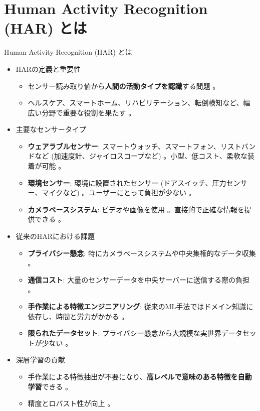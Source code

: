 \documentclass[unicode,12pt,aspectratio=169,dvipdfmx]{beamer}
\begin{document}
\section{Human Activity Recognition (HAR) とは}
\begin{frame}{Human Activity Recognition (HAR) とは}
    \begin{itemize}
        \item HARの定義と重要性
        \begin{itemize}
            \item センサー読み取り値から\textbf{人間の活動タイプを認識}する問題 \cite{Source222}。
            \item ヘルスケア、スマートホーム、リハビリテーション、転倒検知など、幅広い分野で重要な役割を果たす \cite{Source2, Source6}。
        \end{itemize}
        \item 主要なセンサータイプ
        \begin{itemize}
            \item \textbf{ウェアラブルセンサー}: スマートウォッチ、スマートフォン、リストバンドなど (加速度計、ジャイロスコープなど) \cite{Source9}。小型、低コスト、柔軟な装着が可能 \cite{Source445}。
            \item \textbf{環境センサー}: 環境に設置されたセンサー (ドアスイッチ、圧力センサー、マイクなど) \cite{Source13}。ユーザーにとって負担が少ない \cite{Source14}。
            \item \textbf{カメラベースシステム}: ビデオや画像を使用 \cite{Source219}。直接的で正確な情報を提供できる \cite{Source219}。
        \end{itemize}
        \item 従来のHARにおける課題
        \begin{itemize}
            \item \textbf{プライバシー懸念}: 特にカメラベースシステムや中央集権的なデータ収集 \cite{Source436, Source440}。
            \item \textbf{通信コスト}: 大量のセンサーデータを中央サーバーに送信する際の負担 \cite{Source440}。
            \item \textbf{手作業による特徴エンジニアリング}: 従来のML手法ではドメイン知識に依存し、時間と労力がかかる \cite{Source221}。
            \item \textbf{限られたデータセット}: プライバシー懸念から大規模な実世界データセットが少ない \cite{Source419}。
        \end{itemize}
        \item 深層学習の貢献
        \begin{itemize}
            \item 手作業による特徴抽出が不要になり、\textbf{高レベルで意味のある特徴を自動学習}できる \cite{Source221, Source381}。
            \item 精度とロバスト性が向上 \cite{Source221, Source381}。
        \end{itemize}
    \end{itemize}
\end{frame}
\end{document}
